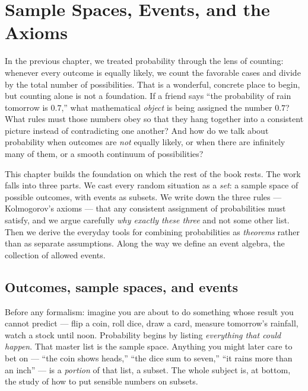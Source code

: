 \chapter{Sample Spaces, Events, and the Axioms}

In the previous chapter, we treated probability through the lens of counting:
whenever every outcome is equally likely, we count the favorable cases and
divide by the total number of possibilities. That is a wonderful, concrete place
to begin, but counting alone is not a foundation. If a friend says ``the
probability of rain tomorrow is $0.7$,'' what mathematical \emph{object} is being
assigned the number $0.7$? What rules must those numbers obey so that they hang
together into a consistent picture instead of contradicting one another? And how
do we talk about probability when outcomes are \emph{not} equally likely, or when
there are infinitely many of them, or a smooth continuum of possibilities?

This chapter builds the foundation on which the rest of the book rests. The
work falls into three parts. We cast every random situation as a \emph{set}: a
sample space of possible outcomes, with events as subsets. We write down
the three rules --- Kolmogorov's axioms --- that any consistent assignment of
probabilities must satisfy, and we argue carefully \emph{why exactly these three}
and not some other list. Then we derive the everyday tools for combining probabilities as \emph{theorems} rather than as separate assumptions. Along the way we define an event algebra, the collection of allowed events.

\section{Outcomes, sample spaces, and events}
\label{ch03:sets}

\begin{intuitionbox}
Before any formalism: imagine you are about to do something whose result you
cannot predict --- flip a coin, roll dice, draw a card, measure tomorrow's
rainfall, watch a stock until noon. Probability begins by listing
\emph{everything that could happen}. That master list is the sample space.
Anything you might later care to bet on --- ``the coin shows heads,'' ``the dice
sum to seven,'' ``it rains more than an inch'' --- is a \emph{portion} of
that list, a subset. The whole subject is, at bottom, the study of how to put
sensible numbers on subsets.
\end{intuitionbox}


